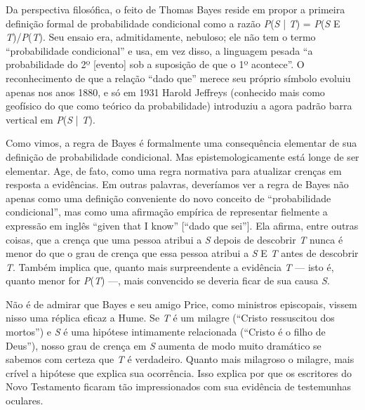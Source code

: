 \documentclass[11pt,a5paper,twoside]{book}
\begin{document}
Da perspectiva filosófica, o feito de Thomas Bayes reside em propor a primeira definição formal de probabilidade condicional como a razão \textit{P}(\textit{S} | \textit{T}) = \textit{P}(\textit{S} E \textit{T})/\textit{P}(\textit{T}). Seu ensaio era, admitidamente, nebuloso; ele não tem o termo “probabilidade condicional” e usa, em vez disso, a linguagem pesada “a probabilidade do 2º [evento] sob a suposição de que o 1º acontece”. O reconhecimento de que a relação “dado que” merece seu próprio símbolo evoluiu apenas nos anos 1880, e só em 1931 Harold Jeffreys (conhecido mais como geofísico do que como teórico da probabilidade) introduziu a agora padrão barra vertical em \textit{P}(\textit{S} | \textit{T}).

Como vimos, a regra de Bayes é formalmente uma consequência elementar de sua definição de probabilidade condicional. Mas epistemologicamente está longe de ser elementar. Age, de fato, como uma regra normativa para atualizar crenças em resposta a evidências. Em outras palavras, deveríamos ver a regra de Bayes não apenas como uma definição conveniente do novo conceito de “probabilidade condicional”, mas como uma afirmação empírica de representar fielmente a expressão em inglês “given that I know” [“dado que sei”]. Ela afirma, entre outras coisas, que a crença que uma pessoa atribui a \textit{S} depois de descobrir \textit{T} nunca é menor do que o grau de crença que essa pessoa atribui a \textit{S} E \textit{T} antes de descobrir \textit{T}. Também implica que, quanto mais surpreendente a evidência \textit{T} — isto é, quanto menor for \textit{P}(\textit{T}) —, mais convencido se deveria ficar de sua causa \textit{S}.

Não é de admirar que Bayes e seu amigo Price, como ministros episcopais, vissem nisso uma réplica eficaz a Hume. Se \textit{T} é um milagre (“Cristo ressuscitou dos mortos”) e \textit{S} é uma hipótese intimamente relacionada (“Cristo é o filho de Deus”), nosso grau de crença em \textit{S} aumenta de modo muito dramático se sabemos com certeza que \textit{T} é verdadeiro. Quanto mais milagroso o milagre, mais crível a hipótese que explica sua ocorrência. Isso explica por que os escritores do Novo Testamento ficaram tão impressionados com sua evidência de testemunhas oculares.
\end{document}

